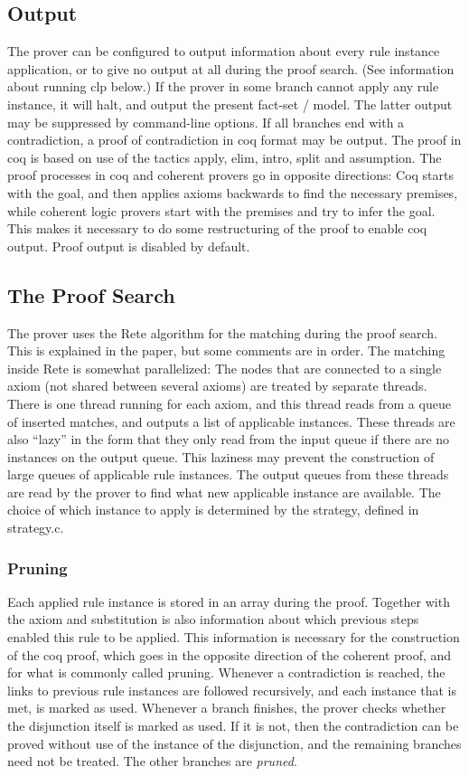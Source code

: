 \documentclass[a4paper]{article}
\begin{document}
\subsection{Output}
The prover can be configured to output information about every rule instance application, or to give no output at all during the proof search. (See information about running clp below.) If the prover in some branch cannot apply any rule instance, it will halt, and output the present fact-set / model. The latter output may be suppressed by command-line options. If all branches end with a contradiction, a proof of contradiction in coq format may be output. The proof in coq is based on use of the tactics apply, elim, intro, split and assumption. The proof processes in coq and coherent provers go in opposite directions: Coq starts with the goal, and then applies axioms backwards to find the necessary premises, while coherent logic provers start with the premises and try to infer the goal. This makes it necessary to do some restructuring of the proof to enable coq output. Proof output is disabled by default.

\subsection{The Proof Search}
The prover uses the Rete algorithm for the matching during the proof search. This is explained in the paper, but some comments are in order. The matching inside Rete is somewhat parallelized: The nodes that are connected to a single axiom (not shared between several axioms) are treated by separate threads. There is one thread running for each axiom, and this thread reads from a queue of inserted matches, and outputs a list of applicable instances. These threads are also ``lazy'' in the form that they only read from the input queue if there are no instances on the output queue. This laziness may prevent the construction of large queues of applicable rule instances. The output queues from these threads are read by the prover to find what new applicable instance are available. The choice of which instance to apply is determined by the strategy, defined in strategy.c.

\subsubsection{Pruning}
Each applied rule instance is stored in an array during the proof. Together with the axiom and substitution is also information about which previous steps enabled this rule to be applied. This information is necessary for the construction of the coq proof, which goes in the opposite direction of the coherent proof, and for what is commonly called pruning. Whenever a contradiction is reached, the links to previous rule instances are followed recursively, and each instance that is met, is marked as used. Whenever a branch finishes, the prover checks whether the disjunction itself is marked as used. If it is not, then the contradiction can be proved without use of the instance of the disjunction, and the remaining branches need not be treated. The other branches are \emph{pruned}.
\end{document}
